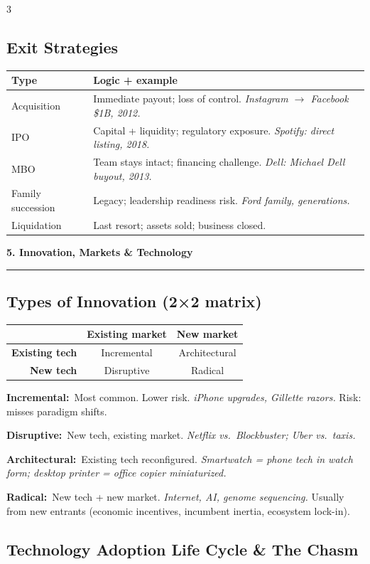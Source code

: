 \documentclass[7.6pt,letterpaper]{article}
\newcommand{\secbar}[1]{%
    \vspace{2pt}\noindent\textbf{#1}\par\vspace{1pt}\hrule\vspace{2pt}%
  }
\newcommand{\secbar}[1]{%
    \vspace{3pt}%
    \noindent\colorbox{navy}{\parbox{\dimexpr\linewidth-2\fboxsep}{%
      \fontsize{6.8pt}{8pt}\sffamily\bfseries\color{white}\strut\ #1\strut}}%
    \vspace{1pt}\par%
  }
\newcommand{\T}[1]{\textbf{\color{navy}#1}}
\newcommand{\kk}[2]{\noindent\T{#1}\ #2\par}
\newcommand{\eg}[1]{\textit{\color{mid}#1}}
\newcommand{\sh}{\rowcolor{strip}}
\newcommand{\ctab}[1]{{\fontsize{6.2pt}{7pt}\selectfont\setlength{\tabcolsep}{2.5pt}#1}}
\begin{document}
\begin{multicols}{3}
\subsection{Exit Strategies}

\ctab{\begin{tabular}{@{}p{1.4cm}p{4.2cm}@{}}
\toprule
\sh \T{Type} & \T{Logic + example} \\
\midrule
Acquisition & Immediate payout; loss of control. \eg{Instagram $\to$ Facebook \$1B, 2012.} \\
IPO & Capital + liquidity; regulatory exposure. \eg{Spotify: direct listing, 2018.} \\
MBO & Team stays intact; financing challenge. \eg{Dell: Michael Dell buyout, 2013.} \\
Family succession & Legacy; leadership readiness risk. \eg{Ford family, generations.} \\
Liquidation & Last resort; assets sold; business closed. \\
\bottomrule
\end{tabular}}

\secbar{5. Innovation, Markets \& Technology}

\subsection{Types of Innovation (2×2 matrix)}

\ctab{\begin{tabular}{@{}r|cc@{}}
\sh & \T{Existing market} & \T{New market} \\
\hline
\T{Existing tech} & Incremental & Architectural \\
\T{New tech} & Disruptive & Radical \\
\end{tabular}}

\kk{Incremental:}{Most common. Lower risk. \eg{iPhone upgrades, Gillette razors.} Risk: misses paradigm shifts.}
\kk{Disruptive:}{New tech, existing market. \eg{Netflix vs.\ Blockbuster; Uber vs.\ taxis.}}
\kk{Architectural:}{Existing tech reconfigured. \eg{Smartwatch = phone tech in watch form; desktop printer = office copier miniaturized.}}
\kk{Radical:}{New tech + new market. \eg{Internet, AI, genome sequencing.} Usually from new entrants (economic incentives, incumbent inertia, ecosystem lock-in).}

\subsection{Technology Adoption Life Cycle \& The Chasm}


\end{multicols}
\end{document}
